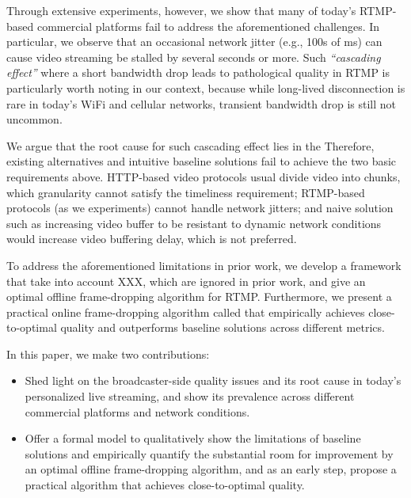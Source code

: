 Through extensive experiments, however, we show that many of today's RTMP-based commercial platforms fail to address the aforementioned challenges.
In particular, we observe that an occasional network jitter (e.g., 100s of ms) can cause video streaming be stalled by several seconds or more. 
Such {\em ``cascading effect''} where a short bandwidth drop leads to pathological quality in RTMP is particularly worth noting in our context, because while long-lived disconnection is rare in today's WiFi and cellular networks, transient bandwidth drop is still not uncommon. 


We argue that the root cause for such cascading effect lies in the 
Therefore, existing alternatives and intuitive baseline solutions fail to achieve the two basic requirements above. 
HTTP-based video protocols usual divide video into chunks, which granularity cannot satisfy the timeliness requirement; 
RTMP-based protocols (as we experiments) cannot handle network jitters; 
and naive solution such as increasing video buffer to be resistant to dynamic network conditions would increase video buffering delay, which is not preferred. 


To address the aforementioned limitations in prior work, we develop a framework that take into account XXX, which are ignored in prior work, and give an optimal offline frame-dropping algorithm for RTMP. 
Furthermore, we present a practical online frame-dropping algorithm called  that empirically achieves close-to-optimal quality and outperforms baseline solutions across different metrics.


In this paper, we make two contributions:
\begin{itemize}
\item Shed light on the broadcaster-side quality issues and its root cause in today's personalized live streaming, and show its prevalence across different commercial platforms and network conditions.
\item Offer a formal model to qualitatively show the limitations of baseline solutions and empirically quantify the substantial room for improvement by an optimal offline frame-dropping algorithm, and as an early step, propose a practical algorithm that achieves close-to-optimal quality.
\end{itemize}




